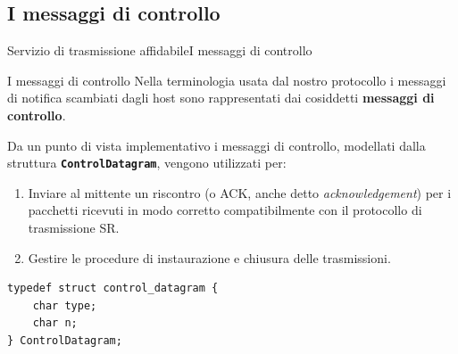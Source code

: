 \documentclass[10pt]{beamer}
\begin{document}
\subsection{I messaggi di controllo}
\begin{frame}[fragile]{Servizio di trasmissione affidabile}{I messaggi di controllo}

\begin{block}{I messaggi di controllo}
Nella terminologia usata dal nostro protocollo i messaggi di notifica scambiati dagli host sono rappresentati dai cosiddetti \textbf{messaggi di controllo}. 
\end{block}

Da un punto di vista implementativo i messaggi di controllo, modellati dalla struttura \textbf{\texttt{ControlDatagram}}, vengono utilizzati per:

\begin{enumerate}
\item Inviare al mittente un riscontro (o ACK, anche detto \textit{acknowledgement}) per i pacchetti ricevuti in modo corretto compatibilmente con il protocollo di trasmissione SR.
\item Gestire le procedure di instaurazione e chiusura delle trasmissioni.
\end{enumerate}

\begin{lstlisting}[frame=lines, caption={Implementazione della struttura \texttt{ControlDatagram}}]
typedef struct control_datagram {
	char type;
	char n;
} ControlDatagram;
\end{lstlisting}


\end{frame}


\end{document}
